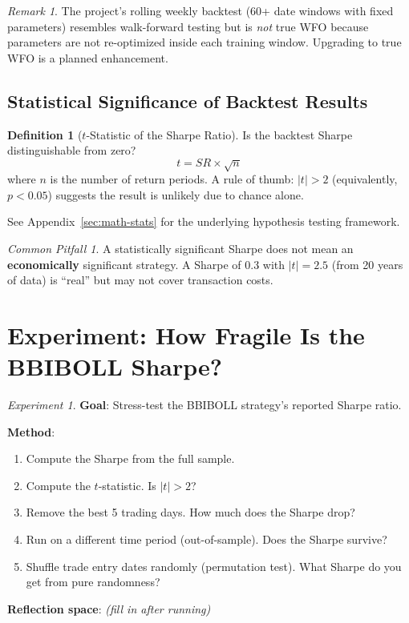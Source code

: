 \documentclass[a4paper, 11pt]{report}
\theoremstyle{definition}
\newtheorem{definition}{Definition}[chapter]
\theoremstyle{remark}
\newtheorem{remark}{Remark}[chapter]
\newtheorem{experiment}{Experiment}[chapter]
\newtheorem{pitfall}{Common Pitfall}[chapter]
\begin{document}
\begin{remark}
    The project's rolling weekly backtest (60+ date windows with fixed
    parameters) resembles walk-forward testing but is \emph{not} true WFO
    because parameters are not re-optimized inside each training window.
    Upgrading to true WFO is a planned enhancement.
\end{remark}

\subsection{Statistical Significance of Backtest Results}

\begin{definition}[$t$-Statistic of the Sharpe Ratio]
    Is the backtest Sharpe distinguishable from zero?
    \[
        t = SR \times \sqrt{n}
    \]
    where $n$ is the number of return periods.  A rule of thumb: $|t| > 2$
    (equivalently, $p < 0.05$) suggests the result is unlikely due to chance
    alone.

    See Appendix~\ref{sec:math-stats} for the underlying hypothesis testing
    framework.
\end{definition}

\begin{pitfall}
    A statistically significant Sharpe does not mean an \textbf{economically}
    significant strategy.  A Sharpe of 0.3 with $|t| = 2.5$ (from 20 years of
    data) is ``real'' but may not cover transaction costs.
\end{pitfall}

\section{Experiment: How Fragile Is the BBIBOLL Sharpe?}

\begin{experiment}
    \textbf{Goal}: Stress-test the BBIBOLL strategy's reported Sharpe ratio.

    \textbf{Method}:
    \begin{enumerate}
        \item Compute the Sharpe from the full sample.
        \item Compute the $t$-statistic.  Is $|t| > 2$?
        \item Remove the best 5 trading days.  How much does the Sharpe drop?
        \item Run on a different time period (out-of-sample).  Does the Sharpe
              survive?
        \item Shuffle trade entry dates randomly (permutation test).  What
              Sharpe do you get from pure randomness?
    \end{enumerate}

    \textbf{Reflection space}: \emph{(fill in after running)}
\end{experiment}
\end{document}
